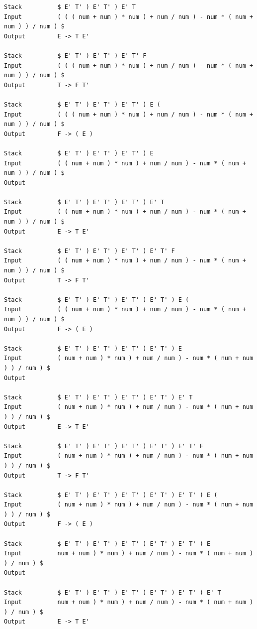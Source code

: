 \documentclass[lang=cn,11pt,a4paper,cite=authornum]{paper}
\begin{document}
\begin{code}
\begin{verbatim}
Stack          $ E' T' ) E' T' ) E' T 
Input          ( ( ( num + num ) * num ) + num / num ) - num * ( num + num ) ) / num ) $ 
Output         E -> T E' 

Stack          $ E' T' ) E' T' ) E' T' F 
Input          ( ( ( num + num ) * num ) + num / num ) - num * ( num + num ) ) / num ) $ 
Output         T -> F T' 

Stack          $ E' T' ) E' T' ) E' T' ) E ( 
Input          ( ( ( num + num ) * num ) + num / num ) - num * ( num + num ) ) / num ) $ 
Output         F -> ( E ) 

Stack          $ E' T' ) E' T' ) E' T' ) E 
Input          ( ( num + num ) * num ) + num / num ) - num * ( num + num ) ) / num ) $ 
Output         

Stack          $ E' T' ) E' T' ) E' T' ) E' T 
Input          ( ( num + num ) * num ) + num / num ) - num * ( num + num ) ) / num ) $ 
Output         E -> T E' 

Stack          $ E' T' ) E' T' ) E' T' ) E' T' F 
Input          ( ( num + num ) * num ) + num / num ) - num * ( num + num ) ) / num ) $ 
Output         T -> F T' 

Stack          $ E' T' ) E' T' ) E' T' ) E' T' ) E ( 
Input          ( ( num + num ) * num ) + num / num ) - num * ( num + num ) ) / num ) $ 
Output         F -> ( E ) 

Stack          $ E' T' ) E' T' ) E' T' ) E' T' ) E 
Input          ( num + num ) * num ) + num / num ) - num * ( num + num ) ) / num ) $ 
Output         

Stack          $ E' T' ) E' T' ) E' T' ) E' T' ) E' T 
Input          ( num + num ) * num ) + num / num ) - num * ( num + num ) ) / num ) $ 
Output         E -> T E' 

Stack          $ E' T' ) E' T' ) E' T' ) E' T' ) E' T' F 
Input          ( num + num ) * num ) + num / num ) - num * ( num + num ) ) / num ) $ 
Output         T -> F T' 

Stack          $ E' T' ) E' T' ) E' T' ) E' T' ) E' T' ) E ( 
Input          ( num + num ) * num ) + num / num ) - num * ( num + num ) ) / num ) $ 
Output         F -> ( E ) 

Stack          $ E' T' ) E' T' ) E' T' ) E' T' ) E' T' ) E 
Input          num + num ) * num ) + num / num ) - num * ( num + num ) ) / num ) $ 
Output         

Stack          $ E' T' ) E' T' ) E' T' ) E' T' ) E' T' ) E' T 
Input          num + num ) * num ) + num / num ) - num * ( num + num ) ) / num ) $ 
Output         E -> T E' 


\end{verbatim}
\end{code}
\end{document}
